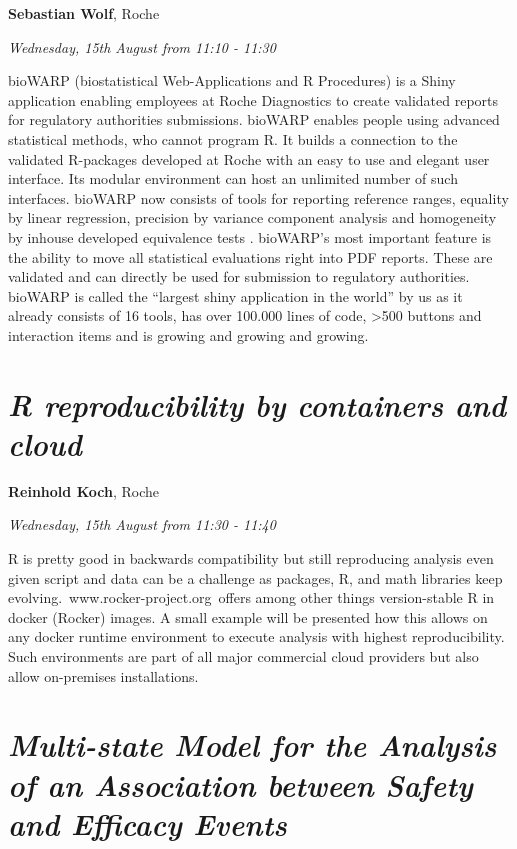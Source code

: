 \documentclass[]{book}
\theoremstyle{definition}
\theoremstyle{definition}
\theoremstyle{definition}
\theoremstyle{remark}
\begin{document}
\textbf{Sebastian Wolf}, Roche

\emph{Wednesday, 15th August from 11:10 - 11:30}

bioWARP (biostatistical Web-Applications and R Procedures) is a Shiny
application enabling employees at Roche Diagnostics to create validated
reports for regulatory authorities submissions. bioWARP enables people
using advanced statistical methods, who cannot program R. It builds a
connection to the validated R-packages developed at Roche with an easy
to use and elegant user interface. Its modular environment can host an
unlimited number of such interfaces. bioWARP now consists of tools for
reporting reference ranges, equality by linear regression, precision by
variance component analysis and homogeneity by inhouse developed
equivalence tests . bioWARP's most important feature is the ability to
move all statistical evaluations right into PDF reports. These are
validated and can directly be used for submission to regulatory
authorities. bioWARP is called the ``largest shiny application in the
world'' by us as it already consists of 16 tools, has over 100.000 lines
of code, \textgreater{}500 buttons and interaction items and is growing
and growing and growing.

\hypertarget{r-reproducibility-by-containers-and-cloud-1}{%
\section{\texorpdfstring{\emph{R reproducibility by containers and
cloud}}{R reproducibility by containers and cloud}}\label{r-reproducibility-by-containers-and-cloud-1}}

\textbf{Reinhold Koch}, Roche

\emph{Wednesday, 15th August from 11:30 - 11:40}

R is pretty good in backwards compatibility but still reproducing
analysis even given script and data can be a challenge as packages, R,
and math libraries keep evolving.~www.rocker-project.org~offers among
other things version-stable R in docker (Rocker) images. A small example
will be presented how this allows on any docker runtime environment to
execute analysis with highest reproducibility. Such environments are
part of all major commercial cloud providers but also allow on-premises
installations.

\hypertarget{multi-state-model-for-the-analysis-of-an-association-between-safety-and-efficacy-events-1}{%
\section{\texorpdfstring{\emph{Multi-state Model for the Analysis of an
Association between Safety and Efficacy
Events}}{Multi-state Model for the Analysis of an Association between Safety and Efficacy Events}}\label{multi-state-model-for-the-analysis-of-an-association-between-safety-and-efficacy-events-1}}
\end{document}
